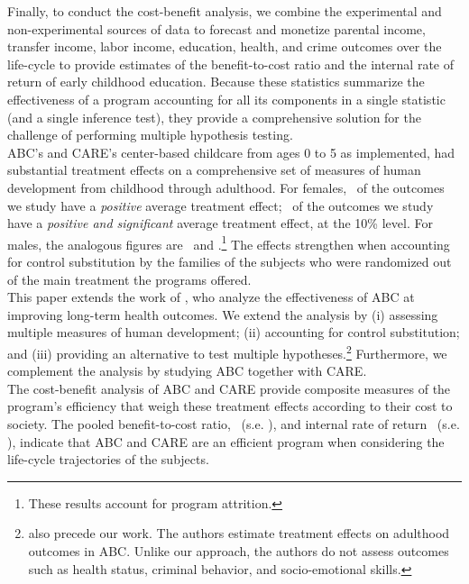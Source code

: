 \noindent Finally, to conduct the cost-benefit analysis, we combine the experimental and non-experimental sources of data to forecast and monetize parental income, transfer income, labor income, education, health, and crime outcomes over the life-cycle to provide estimates of the benefit-to-cost ratio and the internal rate of return of early childhood education. Because these statistics summarize the effectiveness of a program accounting for all its components in a single statistic (and a single inference test), they provide a comprehensive solution for the challenge of performing multiple hypothesis testing.\\

\noindent ABC's and CARE's center-based childcare from ages 0 to 5 as implemented, had substantial treatment effects on a comprehensive set of measures of human development from childhood through adulthood. For females, \positivef\ of the outcomes we study have a \textit{positive} average treatment effect; \positivesf\ of the outcomes we study have a \textit{positive and significant} average treatment effect, at the 10\% level. For males, the analogous figures are \positivem\ and \positivesm.\footnote{These results account for program attrition.} The effects strengthen when accounting for control substitution by the families of the subjects who were randomized out of the main treatment  the programs offered.\\

\noindent This paper extends the work of \citet{Campbell_Conti_etal_2014_EarlyChildhoodInvestments}, who analyze the effectiveness of ABC at improving long-term health outcomes. We extend the analysis by (i) assessing multiple measures of human development; (ii) accounting for control substitution; and (iii) providing an alternative to test multiple hypotheses.\footnote{\cite{Campbell_Pungello_etal_2012_DP} also precede our work. The authors estimate treatment effects on adulthood outcomes in ABC. Unlike our approach, the authors do not assess outcomes such as health status, criminal behavior, and socio-emotional skills.} Furthermore, we complement the analysis by studying ABC together with CARE.\\ 

\noindent The cost-benefit analysis of ABC and CARE provide composite measures of the program's efficiency that weigh these treatment effects according to their cost to society. The pooled benefit-to-cost ratio, \bcp\ (s.e. \bcsep), and internal rate of return \irrp\ (s.e. \irrsep), indicate that ABC and CARE are an efficient program when considering the life-cycle trajectories of the subjects. \\

